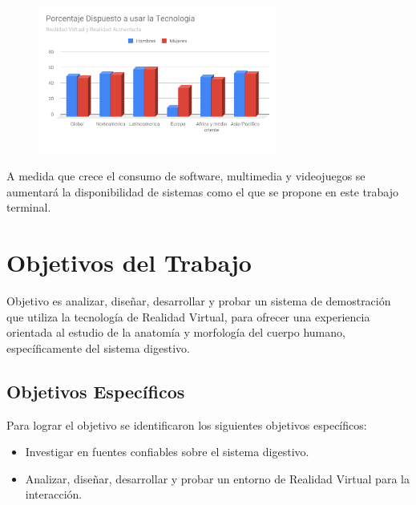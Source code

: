 \begin{figure}[H]
	\begin{center}
 		\includegraphics[width = 0.7\textwidth]{source/images/image10.png}
	\end{center} 
\end{figure}
A medida que crece el consumo de software, multimedia y videojuegos se aumentará la disponibilidad de sistemas como el que se propone en este trabajo terminal.
\\

\section{Objetivos del Trabajo}
Objetivo es analizar, diseñar, desarrollar y probar un sistema de demostración que utiliza la tecnología de Realidad Virtual, para ofrecer una experiencia orientada
 al estudio de la anatomía y morfología del cuerpo humano, específicamente del sistema digestivo.
\newline

\subsection{Objetivos Específicos}
Para lograr el objetivo se identificaron los siguientes objetivos específicos:
\newline
\begin{itemize}
\item Investigar en fuentes confiables sobre el sistema digestivo.
\item Analizar, diseñar, desarrollar y probar un entorno de Realidad Virtual para la interacción.
\end{itemize}

